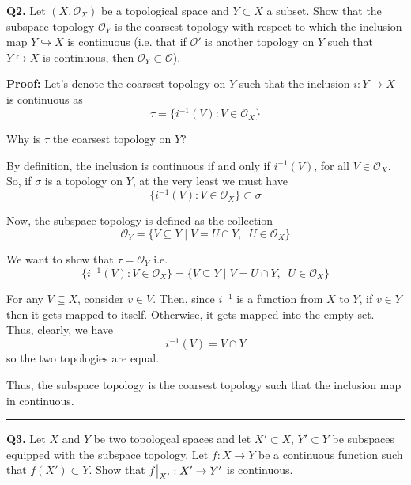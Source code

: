 \documentclass{article}
\newcommand{\restr}[2]{{%
  \left.\kern-\nulldelimiterspace %
  #1 %
  \vphantom{\big|} %
  \right|_{#2} %
  }}
\begin{document}
\vskip 0.5cm

\textbf{Q2.} Let $(X, \mathcal{O}_X)$ be a topological space and $Y \subset X$ a subset. Show that the subspace topology $\mathcal{O}_Y$ is the coarsest topology with respect to which the inclusion map $Y \hookrightarrow X$ is continuous (i.e. that if $\mathcal{O}'$ is another topology on $Y$ such that $Y \hookrightarrow X$ is continuous, then $\mathcal{O}_Y \subset \mathcal{O}$).

\vskip 0.5cm
\textbf{Proof:} Let's denote the coarsest topology on $Y$ such that the inclusion $i : Y \rightarrow X$ is continuous as 
\[ \tau = \{ i^{-1}(V) : V \in \mathcal{O}_X \} \]

\begin{dottedbox}
  Why is $\tau$ the coarsest topology on $Y$?

  \vskip 0.25cm
  By definition, the inclusion is continuous if and only if $i^{-1}(V)$, for all $V \in \mathcal{O}_X$. So, if $\sigma$ is a topology on $Y$, at the very least we must have 
  \[ \{ i^{-1}(V) : V \in \mathcal{O}_X \} \subset \sigma \]
\end{dottedbox}

Now, the subspace  topology is defined as the collection
\[ \mathcal{O}_Y = \{ V \subseteq Y \;|\; V = U \cap Y, \;\;U \in \mathcal{O}_X \}\]

We want to show that $\tau = \mathcal{O}_Y$ i.e. 
\[ \{ i^{-1}(V) : V \in \mathcal{O}_X \} = \{ V \subseteq Y \;|\; V = U \cap Y, \;\;U \in \mathcal{O}_X \} \]

\vskip 0.25cm
For any $V \subseteq X$, consider $v \in V$. Then, since $i^{-1}$ is a function from $X$ to $Y$, if $v \in Y$ then it gets mapped to itself. Otherwise, it gets mapped into the empty set. Thus, clearly, we have 
\[ i^{-1}(V) = V \cap Y \]
so the two topologies are equal.

\vskip 0.25cm
Thus, the subspace topology is the coarsest topology such that the inclusion map in continuous.


\vskip 0.5cm
\hrule 
\vskip 0.5cm

\textbf{Q3.} Let $X$ and $Y$ be two topologcal spaces and let $X' \subset X$, $Y' \subset Y$ be subspaces equipped with the subspace topology. Let $f : X \rightarrow Y$ be a continuous function such that $f(X') \subset Y$. Show that $\restr{f}{X'} : X' \rightarrow Y'$ is continuous.
\end{document}
